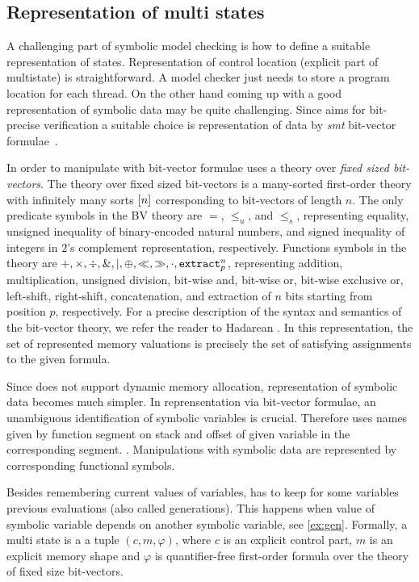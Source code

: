 \subsection{Representation of multi states} \label{sec:multistates}

A challenging part of symbolic model checking is how to define a suitable
representation of states. Representation of control location (explicit part of
multistate) is straightforward. A model checker just needs to store
a program location for each thread. On the other hand coming up with a good
representation of symbolic data may be quite challenging. Since \DIVINE aims
for bit-precise verification a suitable choice is representation of data
by \emph{smt} bit-vector formulae~\cite{Bauch14}.

In order to manipulate with bit-vector formulae \SymDIVINE uses a theory over
\emph{fixed sized bit-vectors}. The theory over fixed sized bit-vectors is a many-sorted
first-order theory with infinitely many sorts $[n]$ corresponding
to bit-vectors of length $n$. The only predicate symbols in the BV theory
are $=$, $\leq_u$, and $\leq_s$, representing
equality, unsigned inequality of binary-encoded natural numbers, and
signed inequality of integers in $2$'s complement representation,
respectively. Functions symbols in the theory are
$+, \times, \div, \&, \mid, \oplus, \ll, \gg, \cdot, \texttt{extract}^{n}_{p}$,
representing addition, multiplication, unsigned division, bit-wise
and, bit-wise or, bit-wise exclusive or, left-shift, right-shift,
concatenation, and extraction of $n$ bits starting from position $p$,
respectively. For a precise description of the syntax and semantics of the bit-vector
theory, we refer the reader to Hadarean \cite{Hadarean14}. In this representation,
the set of represented memory valuations is precisely the set of satisfying assignments
to the given formula.

Since \SymDIVINE does not support dynamic memory allocation, representation
of symbolic data becomes much simpler. In reprensentation via bit-vector
\SMT formulae, an unambiguous identification of symbolic variables is crucial.
Therefore \SymDIVINE uses names given by function
segment on stack and offset of given variable in the corresponding segment. \cite{Mrazek16}.
Manipulations with symbolic data are represented by corresponding functional symbols.

Besides remembering current values of variables, \SymDIVINE has to keep for
some variables previous evaluations (also called generations). This happens when
value of symbolic variable depends on another symbolic variable, see \autoref{ex:gen}. Formally,
a multi state is a a tuple $(c, m, \varphi)$, where $c$ is an explicit control part, $m$ is an
explicit memory shape and $\varphi$ is quantifier-free first-order formula over the theory of fixed size
bit-vectors.

